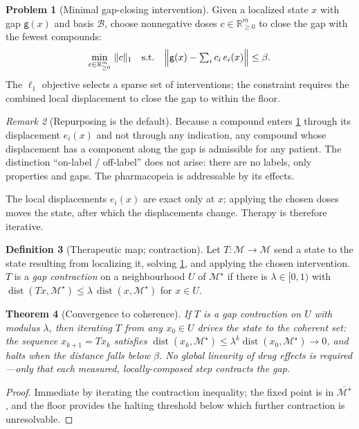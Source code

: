 \documentclass[11pt,a4paper]{article}
\theoremstyle{thmstyle}
\newtheorem{theorem}{Theorem}[section]
\theoremstyle{definition}
\newtheorem{definition}[theorem]{Definition}
\newtheorem{problem}[theorem]{Problem}
\theoremstyle{remark}
\newtheorem{remark}[theorem]{Remark}
\newcommand{\R}{\mathbb{R}}
\newcommand{\Rp}{\R_{\ge 0}}
\newcommand{\Man}{\mathcal{M}}          %
\newcommand{\st}{x}                     %
\newcommand{\gap}{\mathsf{g}}           %
\newcommand{\flo}{\beta}                %
\newcommand{\basis}{\mathcal{B}}        %
\newcommand{\norm}[1]{\lVert#1\rVert}
\DeclareMathOperator{\dist}{dist}
\begin{document}
\begin{problem}[Minimal gap-closing intervention]
\label{prob:closure}
Given a localized state $\st$ with gap $\gap(\st)$ and basis $\basis$,
choose nonnegative doses $c\in\Rp^{m}$ to close the gap with the fewest
compounds:
\[
\min_{c\in\Rp^{m}}\ \norm{c}_1
\quad\text{s.t.}\quad
\Bigl\lVert \gap(\st)-\textstyle\sum_{i}c_i\,e_i(\st)\Bigr\rVert\le\flo .
\]
The $\ell_1$ objective selects a sparse set of interventions; the
constraint requires the combined local displacement to close the gap to
within the floor.
\end{problem}

\begin{remark}[Repurposing is the default]
\label{rem:repurpose}
Because a compound enters \cref{prob:closure} through its displacement
$e_i(\st)$ and not through any indication, any compound whose displacement
has a component along the gap is admissible for any patient. The
distinction ``on-label / off-label'' does not arise: there are no labels,
only properties and gaps. The pharmacopeia is addressable by its effects.
\end{remark}

The local displacements $e_i(\st)$ are exact only at $\st$; applying the
chosen doses moves the state, after which the displacements change. Therapy
is therefore iterative.

\begin{definition}[Therapeutic map; contraction]
\label{def:contraction}
Let $T\colon\Man\to\Man$ send a state to the state resulting from
localizing it, solving \cref{prob:closure}, and applying the chosen
intervention. $T$ is a \emph{gap contraction} on a neighbourhood $U$ of
$\Man^\star$ if there is $\lambda\in[0,1)$ with
$\dist(T\st,\Man^\star)\le\lambda\,\dist(\st,\Man^\star)$ for $\st\in U$.
\end{definition}

\begin{theorem}[Convergence to coherence]
\label{thm:convergence}
If $T$ is a gap contraction on $U$ with modulus $\lambda$, then iterating
$T$ from any $\st_0\in U$ drives the state to the coherent set: the
sequence $\st_{k+1}=T\st_k$ satisfies
$\dist(\st_k,\Man^\star)\le\lambda^k\dist(\st_0,\Man^\star)\to 0$, and halts
when the distance falls below $\flo$. No global linearity of drug effects
is required---only that each measured, locally-composed step contracts the
gap.
\end{theorem}

\begin{proof}
Immediate by iterating the contraction inequality; the fixed point is in
$\overline{\Man^\star}$, and the floor provides the halting threshold below
which further contraction is unresolvable.
\end{proof}
\end{document}
